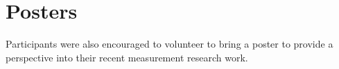 \section{Posters}\label{sec:posters}

Participants were also encouraged to volunteer to bring a poster to provide a
perspective into their recent measurement research work.

